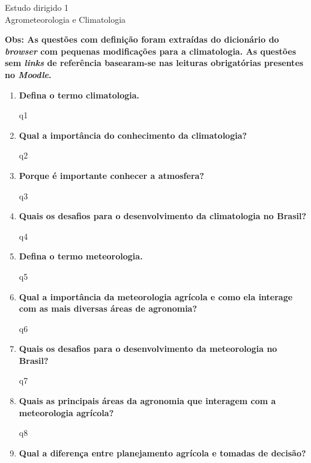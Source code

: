 \documentclass[a4paper, 12pt]{article}
\begin{document}
	\begin{center}
		\begin{large}
			Estudo dirigido 1\\\vspace{.25cm}
			Agrometeorologia e Climatologia
		\end{large}
	\end{center}

	\textbf{Obs: As questões com definição foram extraídas do dicionário do \textit{browser} com pequenas modificações para a climatologia. As questões sem \textit{links} de referência basearam-se nas leituras obrigatórias presentes no \textit{Moodle}.}

	\begin{enumerate}
		\item\textbf{Defina o termo climatologia.}
		
		{q1}
		
		\item\textbf{Qual a importância do conhecimento da climatologia?}
		
		{q2}
		
		\item\textbf{Porque é importante conhecer a atmosfera?}
		
		{q3}
		
		\item\textbf{Quais os desafios para o desenvolvimento da climatologia no Brasil?}
		
		{q4}
		
		\item\textbf{Defina o termo meteorologia.}
		
		{q5}
		
		\item\textbf{Qual a importância da meteorologia agrícola e como ela interage com as mais diversas áreas de agronomia?}

		{q6}
		
		\item\textbf{Quais os desafios para o desenvolvimento da meteorologia no Brasil?}
		
		{q7}
		
		\item\textbf{Quais as principais áreas da agronomia que interagem com a meteorologia agrícola?}
		
		{q8}
		
		\item\textbf{Qual a diferença entre planejamento agrícola e tomadas de decisão?}
		

\end{enumerate}
\end{document}
